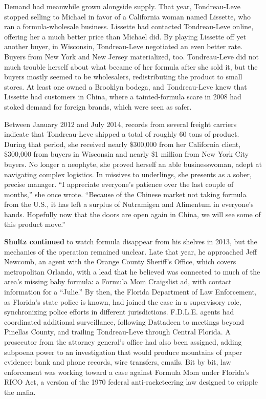 Demand had meanwhile grown alongside supply. That year, Tondreau-Leve
stopped selling to Michael in favor of a California woman named
Lissette, who ran a formula-wholesale business. Lissette had contacted
Tondreau-Leve online, offering her a much better price than Michael did.
By playing Lissette off yet another buyer, in Wisconsin, Tondreau-Leve
negotiated an even better rate. Buyers from New York and New Jersey
materialized, too. Tondreau-Leve did not much trouble herself about what
became of her formula after she sold it, but the buyers mostly seemed to
be wholesalers, redistributing the product to small stores. At least one
owned a Brooklyn bodega, and Tondreau-Leve knew that Lissette had
customers in China, where a tainted-formula scare in 2008 had stoked
demand for foreign brands, which were seen as safer.

Between January 2012 and July 2014, records from several freight
carriers indicate that Tondreau-Leve shipped a total of roughly 60 tons
of product. During that period, she received nearly \$300,000 from her
California client, \$300,000 from buyers in Wisconsin and nearly \$1
million from New York City buyers. No longer a neophyte, she proved
herself an able businesswoman, adept at navigating complex logistics. In
missives to underlings, she presents as a sober, precise manager. ``I
appreciate everyone's patience over the last couple of months,'' she
once wrote. ``Because of the Chinese market not taking formula from the
U.S., it has left a surplus of Nutramigen and Alimentum in everyone's
hands. Hopefully now that the doors are open again in China, we will see
some of this product move.''

\textbf{Shultz continued} to watch formula disappear from his shelves in
2013, but the mechanics of the operation remained unclear. Late that
year, he approached Jeff Newcomb, an agent with the Orange County
Sheriff's Office, which covers metropolitan Orlando, with a lead that he
believed was connected to much of the area's missing baby formula: a
Formula Mom Craigslist ad, with contact information for a ``Julie.'' By
then, the Florida Department of Law Enforcement, as Florida's state
police is known, had joined the case in a supervisory role,
synchronizing police efforts in different jurisdictions. F.D.L.E. agents
had coordinated additional surveillance, following Dattadeen to meetings
beyond Pinellas County, and trailing Tondreau-Leve through Central
Florida. A prosecutor from the attorney general's office had also been
assigned, adding subpoena power to an investigation that would produce
mountains of paper evidence: bank and phone records, wire transfers,
emails. Bit by bit, law enforcement was working toward a case against
Formula Mom under Florida's RICO Act, a version of the 1970 federal
anti-racketeering law designed to cripple the mafia.

